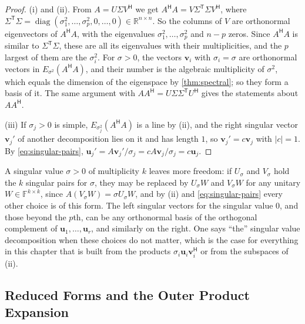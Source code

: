 \begin{proof}
(i) and (ii). From $A=U\Sigma V^{\mathsf H}$ we get $A^{\mathsf H}A=V\Sigma^{\mathsf T}\Sigma V^{\mathsf H}$, where $\Sigma^{\mathsf T}\Sigma=\operatorname{diag}(\sigma_1^2,\ldots,\sigma_p^2,0,\ldots,0)\in\mathbb R^{n\times n}$. So the columns of $V$ are orthonormal eigenvectors of $A^{\mathsf H}A$, with the eigenvalues $\sigma_1^2,\ldots,\sigma_p^2$ and $n-p$ zeros. Since $A^{\mathsf H}A$ is similar to $\Sigma^{\mathsf T}\Sigma$, these are all its eigenvalues with their multiplicities, and the $p$ largest of them are the $\sigma_i^2$. For $\sigma>0$, the vectors $\mathbf v_i$ with $\sigma_i=\sigma$ are orthonormal vectors in $E_{\sigma^2}(A^{\mathsf H}A)$, and their number is the algebraic multiplicity of $\sigma^2$, which equals the dimension of the eigenspace by \cref{thm:spectral}; so they form a basis of it. The same argument with $AA^{\mathsf H}=U\Sigma\Sigma^{\mathsf T}U^{\mathsf H}$ gives the statements about $AA^{\mathsf H}$.

(iii) If $\sigma_j>0$ is simple, $E_{\sigma_j^2}(A^{\mathsf H}A)$ is a line by (ii), and the right singular vector $\mathbf v_j'$ of another decomposition lies on it and has length $1$, so $\mathbf v_j'=c\mathbf v_j$ with $|c|=1$. By \eqref{eq:singular-pairs}, $\mathbf u_j'=A\mathbf v_j'/\sigma_j=cA\mathbf v_j/\sigma_j=c\mathbf u_j$.
\end{proof}

A singular value $\sigma>0$ of multiplicity $k$ leaves more freedom: if $U_\sigma$ and $V_\sigma$ hold the $k$ singular pairs for $\sigma$, they may be replaced by $U_\sigma W$ and $V_\sigma W$ for any unitary $W\in\mathbb F^{k\times k}$, since $A(V_\sigma W)=\sigma U_\sigma W$, and by (ii) and \eqref{eq:singular-pairs} every other choice is of this form. The left singular vectors for the singular value $0$, and those beyond the $p$th, can be any orthonormal basis of the orthogonal complement of $\mathbf u_1,\ldots,\mathbf u_r$, and similarly on the right. One says ``the'' singular value decomposition when these choices do not matter, which is the case for everything in this chapter that is built from the products $\sigma_i\mathbf u_i\mathbf v_i^{\mathsf H}$ or from the subspaces of (ii).

\subsection{Reduced Forms and the Outer Product Expansion}

